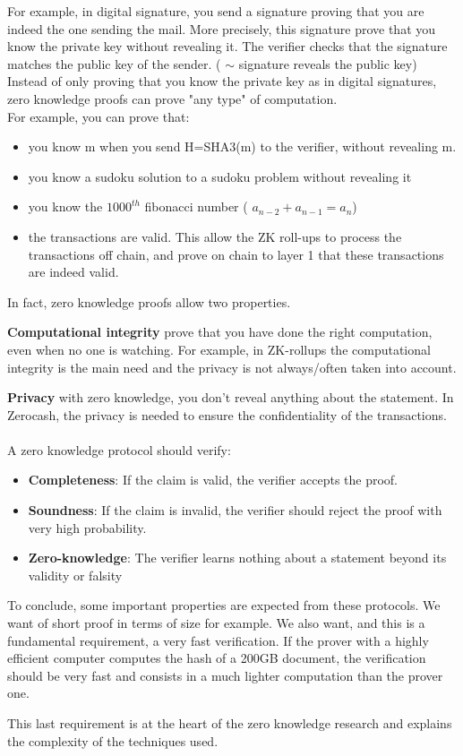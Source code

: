 For example, in digital signature, you send a signature proving that you are indeed the one sending the mail. More precisely, this signature prove that you know the private key without revealing it. The verifier checks that the signature matches the public key of the sender. ( $\sim$ signature reveals the public key)
\\Instead of only proving that you know the private key as in digital signatures, zero knowledge proofs can prove "any type" of computation. 
\\For example, you can prove that: 
\begin{itemize}
    \item you know m when you send H=SHA3(m) to the verifier, without revealing m. 
    \item you know a sudoku solution to a sudoku problem without revealing it 
    \item you know the $1000^{th}$ fibonacci number ( $a_{n-2}+a_{n-1}=a_n$)
    \item the transactions are valid. This allow the ZK roll-ups to process the transactions off chain, and prove on chain to layer 1 that these transactions are indeed valid. 
\end{itemize}

In fact, zero knowledge proofs allow two properties. 

\textbf{Computational integrity} prove that you have done the right computation, even when no one is watching. For example, in ZK-rollups the computational integrity is the main need and the privacy is not always/often taken into account. 

\textbf{Privacy} with zero knowledge, you don't reveal anything about the statement. In Zerocash\cite{sasson2014zerocash}, the privacy is needed to ensure the confidentiality of the transactions. 


\paragraph{} A zero knowledge protocol should verify:
\begin{itemize}
    \item \textbf{Completeness}: If the claim is valid, the verifier accepts the proof.
\item \textbf{Soundness}: If the claim is invalid, the verifier should reject the proof with very high probability.

\item \textbf{Zero-knowledge}: The verifier learns nothing about a statement beyond its validity or falsity 
\end{itemize}

To conclude, some important properties are expected from these protocols. We want of short proof in terms of size for example. We also want, and this is a fundamental requirement, a very fast verification. If the prover with a highly efficient computer computes the hash of a 200GB document, the verification should be very fast and consists in a much lighter computation than the prover one.

This last requirement is at the heart of the zero knowledge research and explains the complexity of the techniques used.